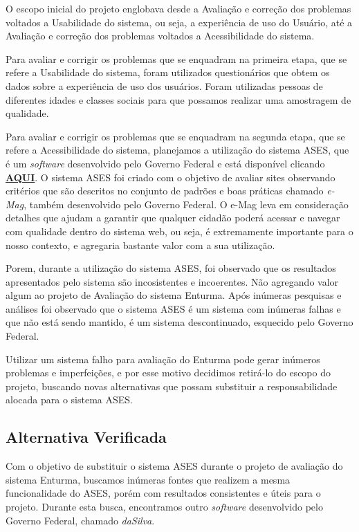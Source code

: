 
O escopo inicial do projeto englobava desde a Avaliação e correção dos problemas voltados a Usabilidade do sistema, ou seja, a experiência de uso do Usuário, até a Avaliação e correção dos problemas voltados a Acessibilidade do sistema.

Para avaliar e corrigir os problemas que se enquadram na primeira etapa, que se refere a Usabilidade do sistema, foram utilizados questionários que obtem os dados sobre a experiência de uso dos usuários. Foram utilizadas pessoas de diferentes idades e classes sociais para que possamos realizar uma amostragem de qualidade.

Para avaliar e corrigir os problemas que se enquadram na segunda etapa, que se refere a Acessibilidade do sistema, planejamos a utilização do sistema ASES, que é um \textit{software} desenvolvido pelo Governo Federal e está disponível clicando \href{http://www.governoeletronico.gov.br/acoes-e-projetos/e-MAG/ases-avaliador-e-simulador-de-acessibilidade-sitios}{\textbf{AQUI}}. O sistema ASES foi criado com o objetivo de avaliar sites observando critérios que são descritos no conjunto de padrões e boas práticas chamado \textit{e-Mag}, também desenvolvido pelo Governo Federal. O e-Mag leva em consideração detalhes que ajudam a garantir que qualquer cidadão poderá acessar e navegar com qualidade dentro do sistema web, ou seja, é extremamente importante para o nosso contexto, e agregaria bastante valor com a sua utilização.

Porem, durante a utilização do sistema ASES, foi observado que os resultados apresentados pelo sistema são incosistentes e incoerentes. Não agregando valor algum ao projeto de Avaliação do sistema Enturma. Após inúmeras pesquisas e análises foi observado que o sistema ASES é um sistema com inúmeras falhas e que não está sendo mantido, é um sistema descontinuado, esquecido pelo Governo Federal.

Utilizar um sistema falho para avaliação do Enturma pode gerar inúmeros problemas e imperfeições, e por esse motivo decidimos retirá-lo do escopo do projeto, buscando novas alternativas que possam substituir a responsabilidade alocada para o sistema ASES.

\subsection{Alternativa Verificada} %
\label{sub:alternativa_verificada}

	Com o objetivo de substituir o sistema ASES durante o projeto de avaliação do sistema Enturma, buscamos inúmeras fontes que realizem a mesma funcionalidade do ASES, porém com resultados consistentes e úteis para o projeto. Durante esta busca, encontramos outro \textit{software} desenvolvido pelo Governo Federal, chamado \textit{daSilva}.

